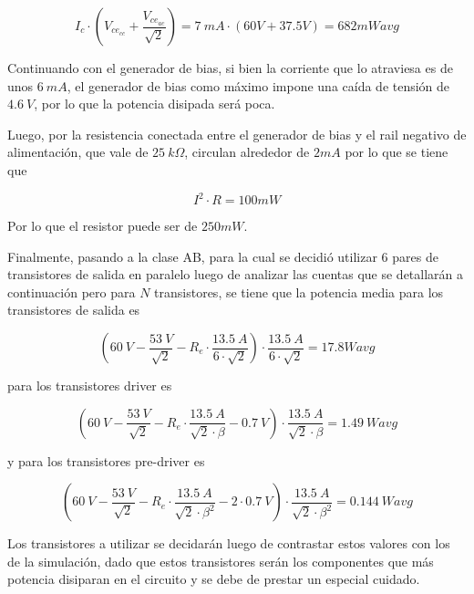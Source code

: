 \begin{equation}
I_{c} \cdot (V_{ce_{cc}} + \frac{V_{ce_{ac}}}{\sqrt{2}}) = 7 \ mA \cdot (60V + 37.5V) = 682mW avg
\end{equation}

Continuando con el generador de bias, si bien la corriente que lo atraviesa es de unos $6 \ mA$, el generador de bias como máximo impone una caída de tensión de $4.6 \ V$, por lo que la potencia disipada será poca.

Luego, por la resistencia conectada entre el generador de bias y el rail negativo de alimentación, que vale de $25 \ k\Omega$, circulan alrededor de $2mA$ por lo que se tiene que

\begin{equation}
I^2 \cdot R = 100mW
\end{equation}

Por lo que el resistor puede ser de $250mW$.

Finalmente, pasando a la clase AB, para la cual se decidió utilizar 6 pares de transistores de salida en paralelo luego de analizar las cuentas que se detallarán a continuación pero para $N$ transistores, se tiene que la potencia media para los transistores de salida es

\begin{equation}
(60 \ V - \frac{53 \ V}{\sqrt{2}} - R_e \cdot \frac{13.5 \ A}{6\cdot \sqrt{2}})\cdot \frac{13.5 \ A}{6\cdot \sqrt{2}} = 17.8W avg
\end{equation}

para los transistores driver es

\begin{equation}
(60 \ V - \frac{53 \ V}{\sqrt{2}} - R_e \cdot \frac{13.5 \ A}{ \sqrt{2} \cdot \beta} - 0.7 \ V)\cdot \frac{13.5 \ A}{ \sqrt{2} \cdot \beta} = 1.49 \ W avg
\end{equation}

y para los transistores pre-driver es

\begin{equation}
(60 \ V - \frac{53 \ V}{\sqrt{2}} - R_e \cdot \frac{13.5 \ A}{ \sqrt{2} \cdot \beta^2} - 2 \cdot 0.7 \ V)\cdot \frac{13.5 \ A}{ \sqrt{2} \cdot \beta^2} = 0.144 \ W avg
\end{equation}

Los transistores a utilizar se decidarán luego de contrastar estos valores con los de la simulación, dado que estos transistores serán los componentes que más potencia disiparan en el circuito y se debe de prestar un especial cuidado.

%
